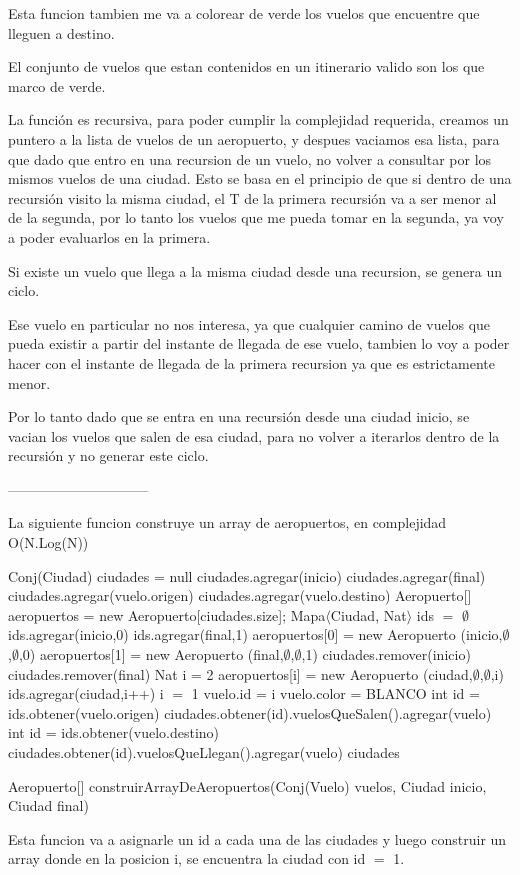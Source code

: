 Esta funcion tambien me va a colorear de verde los vuelos que encuentre que lleguen a destino.

El conjunto de vuelos que estan contenidos en un itinerario valido son los que marco de verde.

La funci\'on es recursiva, para poder cumplir la complejidad requerida, creamos un puntero a la lista de vuelos de un aeropuerto, y despues vaciamos esa lista, para que dado que entro en una recursion de un vuelo, no volver a consultar por los mismos vuelos de una ciudad. Esto se basa en el principio de que si dentro de una recursi\'on visito la misma ciudad, el T de la primera recursi\'on va a ser menor al de la segunda, por lo tanto los vuelos que me pueda tomar en la segunda, ya voy a poder evaluarlos en la primera.

Si existe un vuelo que llega a la misma ciudad desde una recursion, se genera un ciclo.

Ese vuelo en particular no nos interesa, ya que cualquier camino de vuelos que pueda existir a partir del instante de llegada de ese vuelo, tambien lo voy a poder hacer con el instante de llegada de la primera recursion ya que es estrictamente menor. 

Por lo tanto dado que se entra en una recursi\'on desde una ciudad inicio, se vacian los vuelos que salen de esa ciudad, para no volver a iterarlos dentro de la recursi\'on y no generar este ciclo.

------------------------------

La siguiente funcion construye un array de aeropuertos, en complejidad O(N.Log(N))

\begin{algorithm}[H]
\begin{algorithmic}[1]
\STATE Conj(Ciudad) ciudades = null
\STATE ciudades.agregar(inicio)
\STATE ciudades.agregar(final)
	\STATE ciudades.agregar(vuelo.origen)
	\STATE ciudades.agregar(vuelo.destino)
\ENDFOR
\STATE Aeropuerto[] aeropuertos = new Aeropuerto[ciudades.size];
\STATE Mapa$\langle$Ciudad, Nat$\rangle$ ids $=$ $\emptyset$
\STATE ids.agregar(inicio,0)
\STATE ids.agregar(final,1)
\STATE aeropuertos[0] = new Aeropuerto (inicio,$\emptyset$,$\emptyset$,0)
\STATE aeropuertos[1] = new Aeropuerto (final,$\emptyset$,$\emptyset$,1)
\STATE ciudades.remover(inicio)
\STATE ciudades.remover(final)
\STATE Nat i = 2
	\STATE aeropuertos[i] = new Aeropuerto (ciudad,$\emptyset$,$\emptyset$,i)
	\STATE ids.agregar(ciudad,i++)
\ENDFOR
\STATE i $=$ 1
	\STATE vuelo.id = i	
	\STATE vuelo.color = BLANCO	
	\STATE int id = ids.obtener(vuelo.origen)
	\STATE ciudades.obtener(id).vuelosQueSalen().agregar(vuelo)
	\STATE int id = ids.obtener(vuelo.destino)
	\STATE ciudades.obtener(id).vuelosQueLlegan().agregar(vuelo)
\ENDFOR
\RETURN ciudades
\caption{Aeropuerto[] construirArrayDeAeropuertos(Conj(Vuelo) vuelos, Ciudad inicio, Ciudad final)}%
\end{algorithmic}
\end{algorithm}
Esta funcion va a asignarle un id a cada una de las ciudades y luego construir un array donde en la posicion i, se encuentra la ciudad con id $=$ 1.

